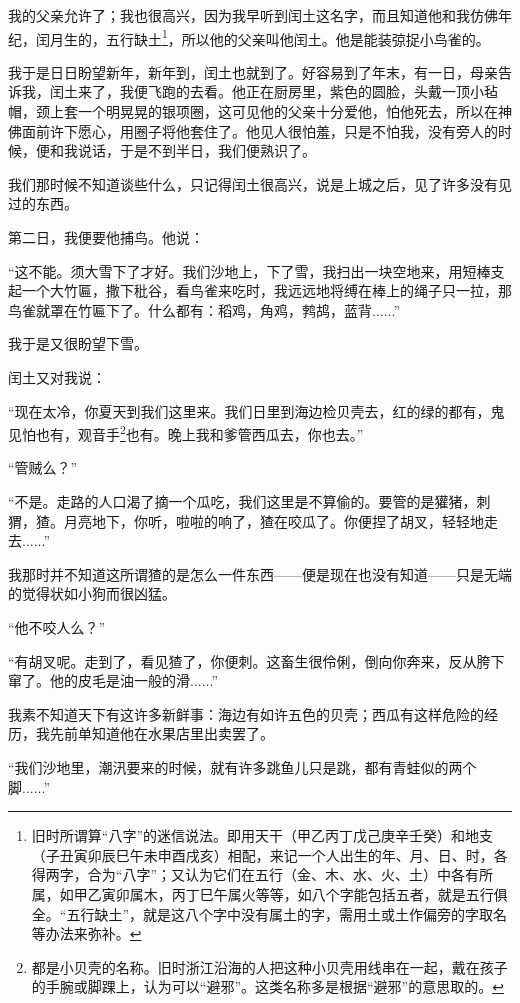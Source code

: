 \documentclass[12pt,UTF8]{ctexbook}
\begin{document}
我的父亲允许了；我也很高兴，因为我早听到闰土这名字，而且知道他和我仿佛年纪，闰月生的，五行缺土\footnote{旧时所谓算“八字”的迷信说法。即用天干（甲乙丙丁戊己庚辛壬癸）和地支（子丑寅卯辰巳午未申酉戌亥）相配，来记一个人出生的年、月、日、时，各得两字，合为“八字”；又认为它们在五行（金、木、水、火、土）中各有所属，如甲乙寅卯属木，丙丁巳午属火等等，如八个字能包括五者，就是五行俱全。“五行缺土”，就是这八个字中没有属土的字，需用土或土作偏旁的字取名等办法来弥补。}，所以他的父亲叫他闰土。他是能装弶捉小鸟雀的。

我于是日日盼望新年，新年到，闰土也就到了。好容易到了年末，有一日，母亲告诉我，闰土来了，我便飞跑的去看。他正在厨房里，紫色的圆脸，头戴一顶小毡帽，颈上套一个明晃晃的银项圈，这可见他的父亲十分爱他，怕他死去，所以在神佛面前许下愿心，用圈子将他套住了。他见人很怕羞，只是不怕我，没有旁人的时候，便和我说话，于是不到半日，我们便熟识了。

我们那时候不知道谈些什么，只记得闰土很高兴，说是上城之后，见了许多没有见过的东西。

第二日，我便要他捕鸟。他说：

“这不能。须大雪下了才好。我们沙地上，下了雪，我扫出一块空地来，用短棒支起一个大竹匾，撒下秕谷，看鸟雀来吃时，我远远地将缚在棒上的绳子只一拉，那鸟雀就罩在竹匾下了。什么都有：稻鸡，角鸡，鹁鸪，蓝背......”

我于是又很盼望下雪。

闰土又对我说：

“现在太冷，你夏天到我们这里来。我们日里到海边检贝壳去，红的绿的都有，鬼见怕也有，观音手\footnote{都是小贝壳的名称。旧时浙江沿海的人把这种小贝壳用线串在一起，戴在孩子的手腕或脚踝上，认为可以“避邪”。这类名称多是根据“避邪”的意思取的。}也有。晚上我和爹管西瓜去，你也去。”

“管贼么？”

“不是。走路的人口渴了摘一个瓜吃，我们这里是不算偷的。要管的是獾猪，刺猬，猹。月亮地下，你听，啦啦的响了，猹在咬瓜了。你便捏了胡叉，轻轻地走去......”

我那时并不知道这所谓猹的是怎么一件东西——便是现在也没有知道——只是无端的觉得状如小狗而很凶猛。

“他不咬人么？”

“有胡叉呢。走到了，看见猹了，你便刺。这畜生很伶俐，倒向你奔来，反从胯下窜了。他的皮毛是油一般的滑......”

我素不知道天下有这许多新鲜事：海边有如许五色的贝壳；西瓜有这样危险的经历，我先前单知道他在水果店里出卖罢了。

“我们沙地里，潮汛要来的时候，就有许多跳鱼儿只是跳，都有青蛙似的两个脚......”
\end{document}
